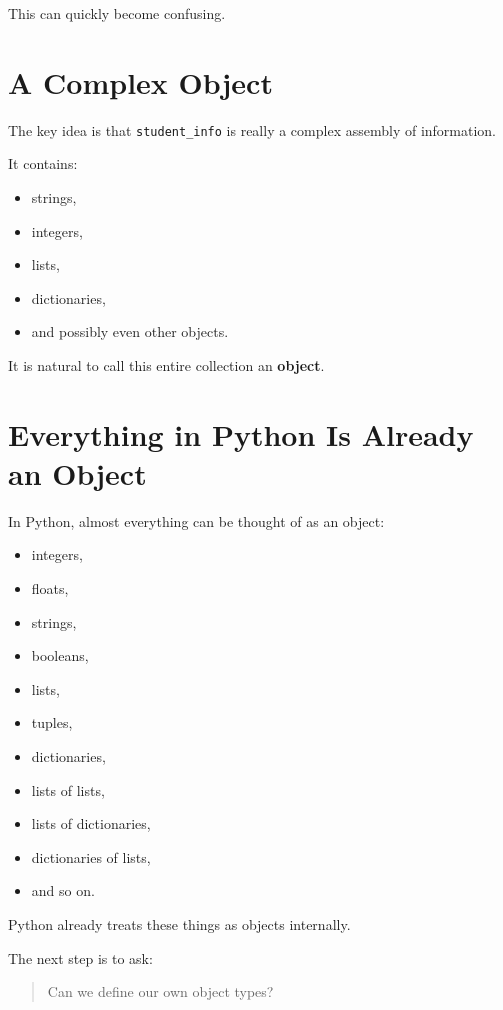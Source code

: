 \documentclass[11pt]{article}
\begin{document}
This can quickly become confusing.

\section{A Complex Object}

The key idea is that \verb|student_info| is really a complex assembly of information.

It contains:

\begin{itemize}
    \item strings,
    \item integers,
    \item lists,
    \item dictionaries,
    \item and possibly even other objects.
\end{itemize}

It is natural to call this entire collection an \textbf{object}.

\section{Everything in Python Is Already an Object}

In Python, almost everything can be thought of as an object:

\begin{itemize}
    \item integers,
    \item floats,
    \item strings,
    \item booleans,
    \item lists,
    \item tuples,
    \item dictionaries,
    \item lists of lists,
    \item lists of dictionaries,
    \item dictionaries of lists,
    \item and so on.
\end{itemize}

Python already treats these things as objects internally.

The next step is to ask:

\begin{quote}
Can we define our own object types?
\end{quote}
\end{document}
